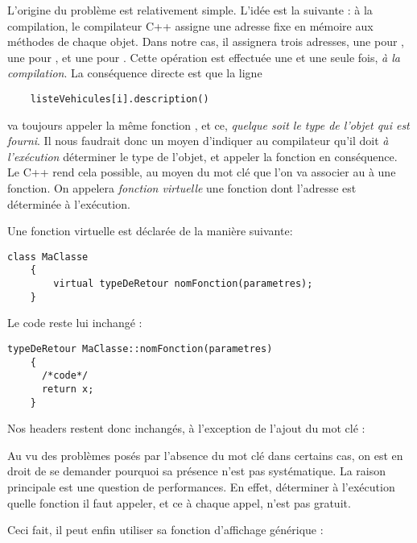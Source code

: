 L'origine du probl\`eme est relativement simple. L'id\'ee est la suivante :
\`a la compilation, le compilateur C++ assigne une adresse fixe en m\'emoire
aux m\'ethodes de chaque objet. Dans notre cas, il assignera trois adresses,
une pour , une pour
, et une pour
. Cette op\'eration est effectu\'ee une et une
seule fois, \emph{\`a la compilation}. La cons\'equence directe est que la
ligne

\begin{lstlisting}
	listeVehicules[i].description()
\end{lstlisting}

va toujours appeler la m\^eme fonction , et
ce, \emph{quelque soit le type de l'objet qui est fourni}. Il nous faudrait
donc un moyen d'indiquer au compilateur qu'il doit \emph{\`a l'ex\'ecution}
d\'eterminer le type de l'objet, et appeler la fonction en cons\'equence. Le
C++ rend cela possible, au moyen du mot cl\'e  que l'on va
associer au \`a une fonction. On appelera \emph{fonction virtuelle} une fonction dont l'adresse est d\'etermin\'ee \`a l'ex\'ecution.

Une fonction virtuelle est d\'eclar\'ee de la mani\`ere suivante:
\begin{lstlisting}[caption = fichier.h]
	class MaClasse
	{
		virtual typeDeRetour nomFonction(parametres);
	}
\end{lstlisting}

Le code reste lui inchang\'e :
\begin{lstlisting}[caption = fichier.cpp]
	typeDeRetour MaClasse::nomFonction(parametres)
	{
	  /*code*/
	  return x;
	}
\end{lstlisting}

Nos headers restent donc inchang\'es, \`a l'exception de l'ajout du mot cl\'e  :



Au vu des probl\`emes pos\'es par l'absence du mot cl\'e  dans
certains cas, on est en droit de se demander pourquoi sa pr\'esence n'est pas
syst\'ematique. La raison principale est une question de performances. En
effet, d\'eterminer \`a l'ex\'ecution quelle fonction il faut appeler, et ce
\`a chaque appel, n'est pas gratuit.


Ceci fait, il peut enfin utiliser sa fonction d'affichage g\'en\'erique :

